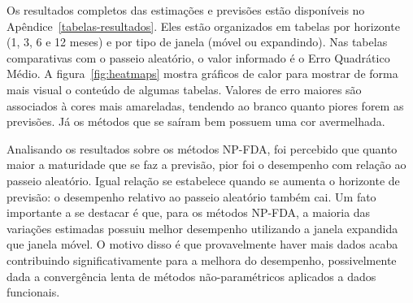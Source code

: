 \documentclass[
	12pt,				%
	openright,			%
	oneside,			%
	a4paper,			%
	english,			%
	brazil				%
	]{dissertacao-ufrgs-abntex2}
\begin{document}
Os resultados completos das estimações e previsões estão disponíveis no Apêndice~\ref{tabelas-resultados}. Eles estão organizados em tabelas por horizonte (1, 3, 6 e 12 meses) e por tipo de janela (móvel ou expandindo). Nas tabelas comparativas com o passeio aleatório, o valor informado é o Erro Quadrático Médio. A figura~\ref{fig:heatmaps} mostra gráficos de calor para mostrar de forma mais visual o conteúdo de algumas tabelas. Valores de erro maiores são associados à cores mais amareladas, tendendo ao branco quanto piores forem as previsões. Já os métodos que se saíram bem possuem uma cor avermelhada.


Analisando os resultados sobre os métodos NP-FDA, foi percebido que quanto maior a maturidade que se faz a previsão, pior foi o desempenho com relação ao passeio aleatório. Igual relação se estabelece quando se aumenta o horizonte de previsão: o desempenho relativo ao passeio aleatório também cai. Um fato importante a se destacar é que, para os métodos NP-FDA, a maioria das variações estimadas possuiu melhor desempenho utilizando a janela expandida que janela móvel. O motivo disso é que provavelmente haver mais dados acaba contribuindo significativamente para a melhora do desempenho, possivelmente dada a convergência lenta de métodos não-paramétricos aplicados a dados funcionais. 



%


\end{document}
